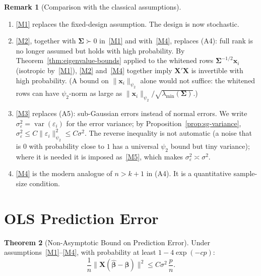 \documentclass[12pt,a4paper]{article}
\theoremstyle{definition}
\newtheorem{theorem}{Theorem}[section]
\newtheorem{remark}[theorem]{Remark}
\DeclareMathOperator\var{var}
\newcommand{\bX}{\mathbf{X}}
\newcommand{\bx}{\mathbf{x}}
\def\bb{\boldsymbol{\beta}}
\newcommand{\bSigma}{\boldsymbol{\Sigma}}
\newcommand{\hbb}{\hat{\boldsymbol{\beta}}}
\begin{document}
\begin{remark}[Comparison with the classical assumptions]
\leavevmode
\begin{enumerate}[label=\textup{(\arabic*)}]
\item \ref{M1} replaces the fixed-design assumption. The design is now stochastic.
\item \ref{M2}, together with $\bSigma \succ 0$ in~\ref{M1} and with~\ref{M4}, replaces (A4): full rank is no longer assumed but holds with high probability. By Theorem~\ref{thm:eigenvalue-bounds} applied to the whitened rows $\bSigma^{-1/2}\bx_i$ (isotropic by~\ref{M1}), \ref{M2} and~\ref{M4} together imply $\bX'\bX$ is invertible with high probability. (A bound on $\|\bx_i\|_{\psi_2}$ alone would not suffice: the whitened rows can have $\psi_2$-norm as large as $\|\bx_i\|_{\psi_2}/\sqrt{\lambda_{\min}(\bSigma)}$.)
\item \ref{M3} replaces (A5): sub-Gaussian errors instead of normal errors. We write $\sigma_\varepsilon^2 = \var(\varepsilon_i)$ for the error variance; by Proposition~\ref{prop:sg-variance}, $\sigma_\varepsilon^2 \leqslant C\|\varepsilon_i\|_{\psi_2}^2 \leqslant C\sigma^2$. The reverse inequality is not automatic (a noise that is $0$ with probability close to $1$ has a universal $\psi_2$ bound but tiny variance); where it is needed it is imposed as~\ref{M5}, which makes $\sigma_\varepsilon^2 \asymp \sigma^2$.
\item \ref{M4} is the modern analogue of $n > k + 1$ in (A4). It is a quantitative sample-size condition.
\end{enumerate}
\end{remark}

\section{OLS Prediction Error}\label{sec:prediction-error}

\begin{theorem}[Non-Asymptotic Bound on Prediction Error]\label{thm:prediction-error}
Under assumptions~\ref{M1}--\ref{M4}, with probability at least $1 - 4\exp(-cp)$:
\begin{equation}\label{eq:prediction-error}
\boxed{\frac{1}{n}\|\bX(\hbb - \bb)\|^2 \leqslant C\sigma^2\,\frac{p}{n}.}
\end{equation}
\end{theorem}
\end{document}
